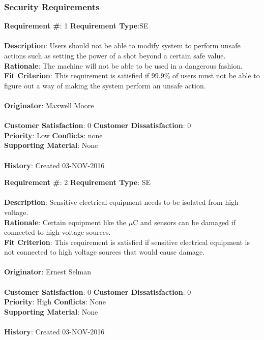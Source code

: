 \documentclass[titlepage]{article}
\begin{document}
\subsubsection{Security Requirements}
\begin{framed}
	\noindent\textbf{Requirement \#}: 1 \hfill \textbf{Requirement Type}:SE \hfill\\\\
	\noindent\textbf{Description}: Users should not be able to modify system to perform unsafe actions such as setting the power of a shot beyond a certain safe value.\\
	\textbf{Rationale}: The machine will not be able to be used in a dangerous fashion.\\
	\textbf{Fit Criterion}: This requirement is satisfied if 99.9\% of users must not be able to figure out a way of making the system perform an unsafe action.\\\\
	\textbf{Originator}: Maxwell Moore\\\\
	\noindent\textbf{Customer Satisfaction}: 0 \hfill 	\textbf{Customer Dissatisfaction}: 0 \hfill\\
	\textbf{Priority}: Low \hfill \textbf{Conflicts}: none \hfill\\
	\textbf{Supporting Material}: None\\\\
	\noindent\textbf{History}: Created 03-NOV-2016
\end{framed}

\begin{framed}
	\noindent\textbf{Requirement \#}: 2 \hfill \textbf{Requirement Type}: SE \hfill\\\\
	\noindent\textbf{Description}: Sensitive electrical equipment needs to be isolated from high voltage.\\
	\textbf{Rationale}: Certain equipment like the $\mu$C and sensors can be damaged if connected to high voltage sources.\\
	\textbf{Fit Criterion}: This requirement is satisfied if sensitive electrical equipment is not connected to high voltage sources that would cause damage.\\\\
	\textbf{Originator}: Ernest Selman\\\\
	\noindent\textbf{Customer Satisfaction}: 0 \hfill 	\textbf{Customer Dissatisfaction}: 0 \hfill\\
	\textbf{Priority}: High \hfill \textbf{Conflicts}: None \hfill\\
	\textbf{Supporting Material}: None\\\\
	\noindent\textbf{History}: Created 03-NOV-2016
\end{framed}
\end{document}
